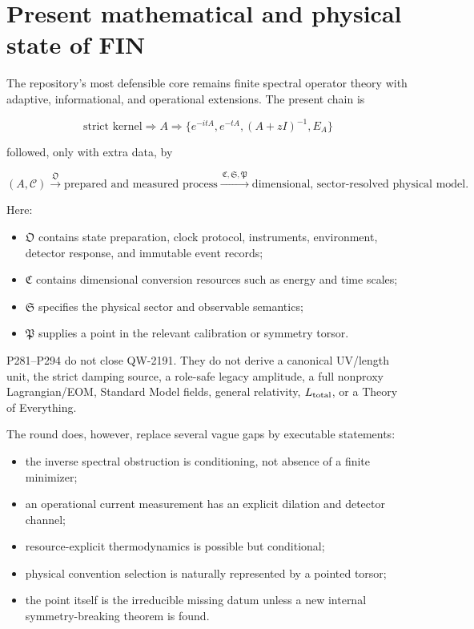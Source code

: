 \documentclass[11pt,a4paper,openany]{report}
\begin{document}
\chapter{Present mathematical and physical state of FIN}

The repository's most defensible core remains finite spectral operator theory with adaptive, informational, and operational extensions. The present chain is

\[
\boxed{
\text{strict kernel}
\Rightarrow
A
\Rightarrow
\{e^{-itA},e^{-tA},(A+zI)^{-1},E_A\}
}
\]

followed, only with extra data, by

\[
(A,\mathcal C)
\xrightarrow{\ \mathfrak O\ }
\text{prepared and measured process}
\xrightarrow{\ \mathfrak C,\mathfrak S,\mathfrak P\ }
\text{dimensional, sector-resolved physical model}.
\]

Here:

\begin{itemize}
\item 
\(\mathfrak O\) contains state preparation, clock protocol, instruments, environment, detector response, and immutable event records;

\item 
\(\mathfrak C\) contains dimensional conversion resources such as energy and time scales;

\item 
\(\mathfrak S\) specifies the physical sector and observable semantics;

\item 
\(\mathfrak P\) supplies a point in the relevant calibration or symmetry torsor.

\end{itemize}

P281--P294 do not close QW-2191. They do not derive a canonical UV/\allowbreak{}length unit, the strict damping source, a role-safe legacy amplitude, a full nonproxy Lagrangian/\allowbreak{}EOM, Standard Model fields, general relativity, \(L_{\rm total}\), or a Theory of Everything.

The round does, however, replace several vague gaps by executable statements:

\begin{itemize}
\item 
the inverse spectral obstruction is conditioning, not absence of a finite minimizer;

\item 
an operational current measurement has an explicit dilation and detector channel;

\item 
resource-explicit thermodynamics is possible but conditional;

\item 
physical convention selection is naturally represented by a pointed torsor;

\item 
the point itself is the irreducible missing datum unless a new internal symmetry-breaking theorem is found.

\end{itemize}
\end{document}
